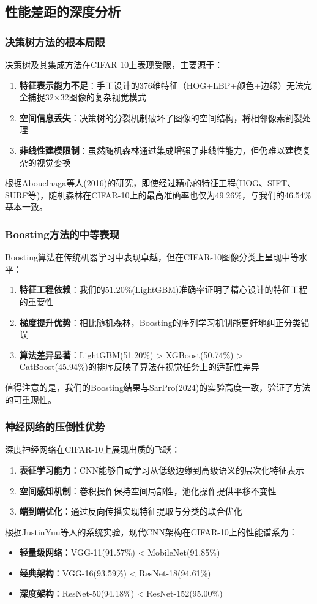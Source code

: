 \documentclass[UTF8]{report}
\theoremstyle{MyLineTheoremStyle} %
\theoremstyle{MyBlockTheoremStyle} %
\theoremstyle{MySubsubsectionStyle} %
\begin{document}
\subsection{性能差距的深度分析}
\subsubsection{决策树方法的根本局限}
决策树及其集成方法在CIFAR-10上表现受限，主要源于：
\begin{enumerate}
    \item \textbf{特征表示能力不足}：手工设计的376维特征（HOG+LBP+颜色+边缘）无法完全捕捉32×32图像的复杂视觉模式
    \item \textbf{空间信息丢失}：决策树的分裂机制破坏了图像的空间结构，将相邻像素割裂处理
    \item \textbf{非线性建模限制}：虽然随机森林通过集成增强了非线性能力，但仍难以建模复杂的视觉变换
\end{enumerate}
根据Abouelnaga等人(2016)的研究，即使经过精心的特征工程(HOG、SIFT、SURF等)，随机森林在CIFAR-10上的最高准确率也仅为49.26\%，与我们的46.54\%基本一致。

\subsubsection{Boosting方法的中等表现}
Boosting算法在传统机器学习中表现卓越，但在CIFAR-10图像分类上呈现中等水平：
\begin{enumerate}
    \item \textbf{特征工程依赖}：我们的51.20\%(LightGBM)准确率证明了精心设计的特征工程的重要性
    \item \textbf{梯度提升优势}：相比随机森林，Boosting的序列学习机制能更好地纠正分类错误
    \item \textbf{算法差异显著}：LightGBM(51.20\%) > XGBoost(50.74\%) > CatBoost(45.94\%)的排序反映了算法在视觉任务上的适配性差异
\end{enumerate}
值得注意的是，我们的Boosting结果与SarPro(2024)的实验高度一致，验证了方法的可重现性。

\subsubsection{神经网络的压倒性优势}
深度神经网络在CIFAR-10上展现出质的飞跃：
\begin{enumerate}
    \item \textbf{表征学习能力}：CNN能够自动学习从低级边缘到高级语义的层次化特征表示
    \item \textbf{空间感知机制}：卷积操作保持空间局部性，池化操作提供平移不变性
    \item \textbf{端到端优化}：通过反向传播实现特征提取与分类的联合优化
\end{enumerate}
根据JustinYuu等人的系统实验，现代CNN架构在CIFAR-10上的性能谱系为：
\begin{itemize}
    \item \textbf{轻量级网络}：VGG-11(91.57\%) < MobileNet(91.85\%)
    \item \textbf{经典架构}：VGG-16(93.59\%) < ResNet-18(94.61\%)
    \item \textbf{深度架构}：ResNet-50(94.18\%) < ResNet-152(95.00\%)
\end{itemize}
\end{document}
